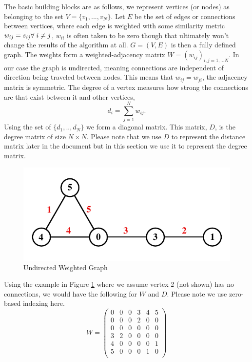 \documentclass[a4paper]{article}
\begin{document}
\begin{multicols}{2}
The basic building blocks are as follows, we represent vertices (or nodes) as belonging to the set $V = \{v_1, ..., v_N \}$. Let $E$ be the set of edges or connections between vertices, where each edge is weighted with some similarity metric $w_{ij} = s_{ij}  \forall \hspace{0.1cm} i \neq j$, $w_{ii}$ is often taken to be zero though that ultimately won't change the results of the algorithm at all. $G = (V, E)$ is then a fully defined graph. The weights form a weighted-adjacency matrix $W = (w_{ij})_{i,j=1,...N}$. In our case the graph is undirected, meaning connections are independent of direction being traveled between nodes. This means that $w_{ij} = w_{ji}$, the adjacency matrix is symmetric. The degree of a vertex measures how strong the connections are that exist between it and other vertices,
$$
d_i = \sum_{j=1}^N w_{ij}.
$$
Using the set of $\{d_1,..,d_N\}$ we form a diagonal matrix. This matrix, $D$, is the degree matrix of size $N \times N$. Please note that we use $D$ to represent the distance matrix later in the document but in this section we use it to represent the degree matrix. 
\begin{figure}[H]
\centering
    \includegraphics[totalheight=2.5cm]{graph.pdf}
    \caption{Undirected Weighted Graph}
    \label{fig:graph1}
\end{figure}
Using the example in Figure \ref{fig:graph1} where we assume vertex 2 (not shown) has no connections, we would have the following for $W$ and $D$. Please note we use zero-based indexing here.
$$
W = 
\begin{pmatrix}
0 & 0 & 0 & 3 & 4 & 5 \\
0 & 0 & 0 & 2 & 0 & 0 \\
0 & 0 & 0 & 0 & 0 & 0 \\
3 & 2 & 0 & 0 & 0 & 0 \\
4 & 0 & 0 & 0 & 0 & 1 \\
5 & 0 & 0 & 0 & 1 & 0 \\

\end{pmatrix}$$
\end{multicols}
\end{document}
